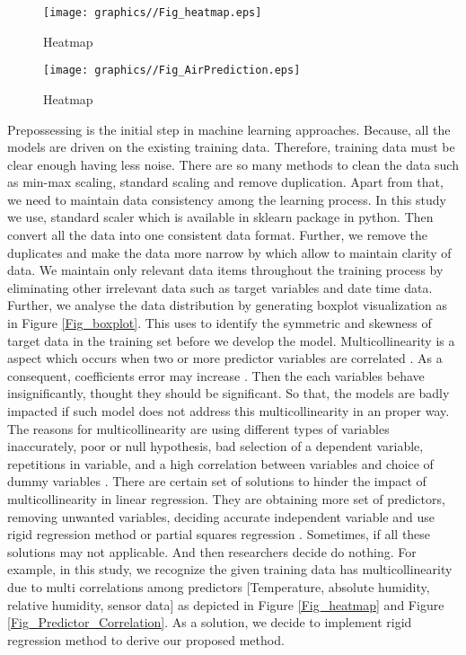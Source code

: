 \begin{figure}
  \centering
 \texttt{[image: graphics//Fig\_heatmap.eps]}
  \caption{Heatmap} \label{Heatmap}
\end{figure}

\begin{figure}
  \centering
 \texttt{[image: graphics//Fig\_AirPrediction.eps]}
  \caption{Heatmap} \label{Heatmap}
\end{figure}



Prepossessing is the initial step in machine learning approaches.
Because, all the models are driven on the existing training data. 
Therefore, training data must be clear enough having less noise.
There are so many methods to clean the data such as min-max scaling,
standard scaling and remove duplication.
Apart from that, we need to maintain data consistency among the learning process.
In this study we use, standard scaler which is available in sklearn package in python.
Then convert all the data into one consistent data format.
Further, we remove the duplicates and 
make the data more narrow by which allow to maintain clarity of data.
We maintain only relevant data items throughout the training process 
by eliminating other irrelevant data such as target variables and date time data.
Further, we analyse the data distribution 
by generating boxplot visualization as in Figure \ref{Fig_boxplot}.
This uses to identify the symmetric 
and skewness of target data in the training set before we develop the model.
Multicollinearity is a aspect which 
occurs when two or more predictor variables are correlated \cite{uyanik2013study}. 
As a consequent, coefficients error may increase \cite{uyanik2013study}.
Then the each variables behave insignificantly, 
thought they should be significant. 
So that, the models are badly impacted 
if such model does not address this multicollinearity in an proper way.
The reasons for multicollinearity are using different 
types of variables inaccurately,
poor or null hypothesis, bad selection of a dependent variable, 
repetitions in variable, and 
a high correlation between variables and 
choice of dummy variables \cite{farrar1967multicollinearity}.
There are certain set of solutions to 
hinder the impact of multicollinearity in linear regression.
They are obtaining more set of predictors, removing 
unwanted variables, deciding accurate independent variable 
and use rigid regression method or partial squares regression \cite{farrar1967multicollinearity}.
Sometimes, if all these solutions may not applicable.
And then researchers decide do nothing.
For example, in this study, 
we recognize the given training data has multicollinearity due to multi 
correlations among predictors [Temperature, absolute humidity, relative humidity, sensor data] 
as depicted in Figure \ref{Fig_heatmap} and Figure \ref{Fig_Predictor_Correlation}.
As a solution, we decide to implement rigid regression method 
to derive our proposed method.


